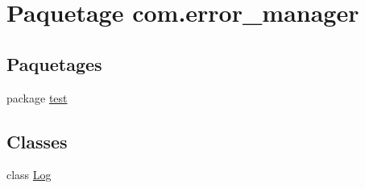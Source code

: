 \hypertarget{namespacecom_1_1error__manager}{\section{Paquetage com.\-error\-\_\-manager}
\label{namespacecom_1_1error__manager}
}
\subsection*{Paquetages}
\begin{DoxyCompactItemize}
\item 
package \hyperlink{namespacecom_1_1error__manager_1_1test}{test}
\end{DoxyCompactItemize}
\subsection*{Classes}
\begin{DoxyCompactItemize}
\item 
class \hyperlink{classcom_1_1error__manager_1_1Log}{Log}
\end{DoxyCompactItemize}
